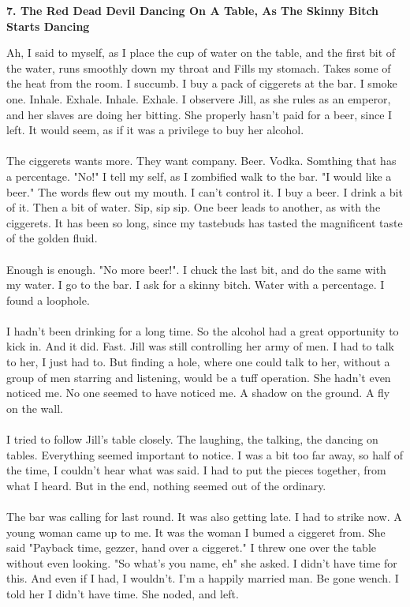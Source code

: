 \documentclass[]{article}
\begin{document}
\newpage

\begin{center}
	\large\textbf{7. The Red Dead Devil Dancing On A Table, \newline As The Skinny Bitch Starts Dancing}
\end{center}

Ah, I said to myself, as I place the cup of water on the table, and the first bit of the water, runs smoothly down my throat and Fills my stomach. Takes some of the heat from the room. I succumb. I buy a pack of ciggerets at the bar. I smoke one. Inhale. Exhale. Inhale. Exhale. I observere Jill, as she rules as an emperor, and her slaves are doing her bitting. She properly hasn't paid for a beer, since I left. It would seem, as if it was a privilege to buy her alcohol.
\\ \\
The ciggerets wants more. They want company. Beer. Vodka. Somthing that has a percentage. "No!" I tell my self, as I zombified walk to the bar. "I would like a beer." The words flew out my mouth. I can't control it. I buy a beer. I drink a bit of it. Then a bit of water. Sip, sip sip. One beer leads to another, as with the ciggerets. It has been so long, since my tastebuds has tasted the magnificent taste of the golden fluid. 
\\ \\
Enough is enough. "No more beer!". I chuck the last bit, and do the same with my water. I go to the bar. I ask for a skinny bitch. Water with a percentage. I found a loophole.
\\ \\
I hadn't been drinking for a long time. So the alcohol had a great opportunity to kick in. And it did. Fast. Jill was still controlling her army of men. I had to talk to her, I just had to. But finding a hole, where one could talk to her, without a group of men starring and listening, would be a tuff operation. She hadn't even noticed me. No one seemed to have noticed me. A shadow on the ground. A fly on the wall.
\\ \\
I tried to follow Jill's table closely. The laughing, the talking, the dancing on tables. Everything seemed important to notice. I was a bit too far away, so half of the time, I couldn't hear what was said. I had to put the pieces together, from what I heard. But in the end, nothing seemed out of the ordinary.
\\ \\
The bar was calling for last round. It was also getting late. I had to strike now. A young woman came up to me. It was the woman I bumed a ciggeret from. She said "Payback time, gezzer, hand over a ciggeret." I threw one over the table without even looking. "So what's you name, eh" she asked. I didn't have time for this. And even if I had, I wouldn't. I'm a happily married man. Be gone wench. I told her I didn't have time. She noded, and left.
\end{document}
